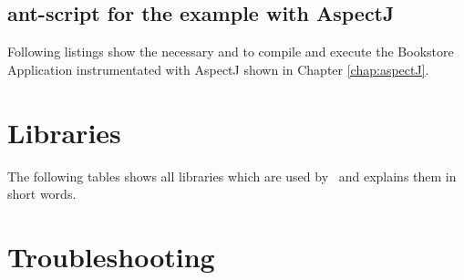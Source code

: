     \section{ant-script for the example with AspectJ}
      Following listings show the necessary  and  to compile and execute the Bookstore Application instrumentated with AspectJ shown in Chapter \ref{chap:aspectJ}.
      \setXMLListing
      
           

  \chapter{Libraries}
    The following tables shows all libraries which are used by \Kieker\ and explains them in short words.
    

\chapter{Troubleshooting}
